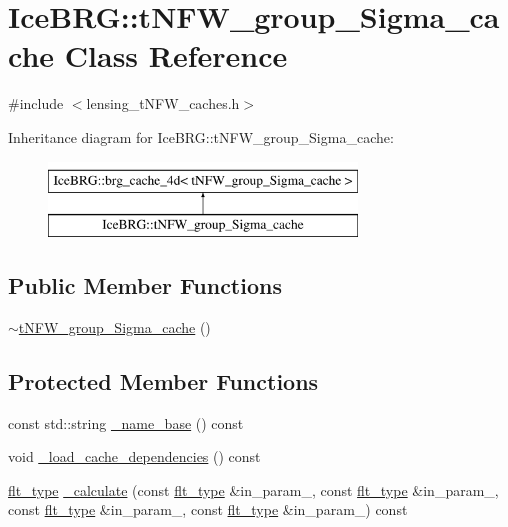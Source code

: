 \hypertarget{classIceBRG_1_1tNFW__group__Sigma__cache}{\section{Ice\-B\-R\-G\-:\-:t\-N\-F\-W\-\_\-group\-\_\-\-Sigma\-\_\-cache Class Reference}
\label{classIceBRG_1_1tNFW__group__Sigma__cache}
}


{\ttfamily \#include $<$lensing\-\_\-t\-N\-F\-W\-\_\-caches.\-h$>$}

Inheritance diagram for Ice\-B\-R\-G\-:\-:t\-N\-F\-W\-\_\-group\-\_\-\-Sigma\-\_\-cache\-:\begin{figure}[H]
\begin{center}
\leavevmode
\includegraphics[height=2.000000cm]{classIceBRG_1_1tNFW__group__Sigma__cache}
\end{center}
\end{figure}
\subsection*{Public Member Functions}
\begin{DoxyCompactItemize}
\item 
\hyperlink{classIceBRG_1_1tNFW__group__Sigma__cache_ac366180ba50597dcfb66e68c75106c10}{$\sim$t\-N\-F\-W\-\_\-group\-\_\-\-Sigma\-\_\-cache} ()
\end{DoxyCompactItemize}
\subsection*{Protected Member Functions}
\begin{DoxyCompactItemize}
\item 
const std\-::string \hyperlink{classIceBRG_1_1tNFW__group__Sigma__cache_a282f8dad6e50f4e532c93f6752fddd93}{\-\_\-name\-\_\-base} () const 
\item 
void \hyperlink{classIceBRG_1_1tNFW__group__Sigma__cache_af9d40651218d6a373ceb870610b82cca}{\-\_\-load\-\_\-cache\-\_\-dependencies} () const 
\item 
\hyperlink{lib_2IceBRG__main_2common_8h_ad0f130a56eeb944d9ef2692ee881ecc4}{flt\-\_\-type} \hyperlink{classIceBRG_1_1tNFW__group__Sigma__cache_af7f054cc977c9ef587561f7a5a6ad539}{\-\_\-calculate} (const \hyperlink{lib_2IceBRG__main_2common_8h_ad0f130a56eeb944d9ef2692ee881ecc4}{flt\-\_\-type} \&in\-\_\-param\-\_, const \hyperlink{lib_2IceBRG__main_2common_8h_ad0f130a56eeb944d9ef2692ee881ecc4}{flt\-\_\-type} \&in\-\_\-param\-\_, const \hyperlink{lib_2IceBRG__main_2common_8h_ad0f130a56eeb944d9ef2692ee881ecc4}{flt\-\_\-type} \&in\-\_\-param\-\_, const \hyperlink{lib_2IceBRG__main_2common_8h_ad0f130a56eeb944d9ef2692ee881ecc4}{flt\-\_\-type} \&in\-\_\-param\-\_) const 
\end{DoxyCompactItemize}
